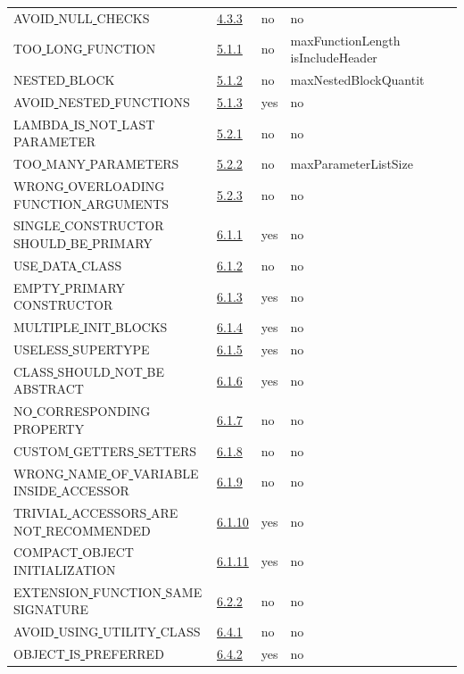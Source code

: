 \begin{longtable}{ |l|p{0.8cm}|p{0.8cm}| p{3cm} | }
AVOID\underline{ }NULL\underline{ }CHECKS & \hyperref[sec:4.3.3]{4.3.3} &  no  &   no  \\
TOO\underline{ }LONG\underline{ }FUNCTION & \hyperref[sec:5.1.1]{5.1.1} &  no  &   maxFunctionLength isIncludeHeader \\
NESTED\underline{ }BLOCK & \hyperref[sec:5.1.2]{5.1.2} &  no  &   maxNestedBlockQuantit\\
AVOID\underline{ }NESTED\underline{ }FUNCTIONS & \hyperref[sec:5.1.3]{5.1.3} &  yes  &   no  \\
LAMBDA\underline{ }IS\underline{ }NOT\underline{ }LAST\underline{ }PARAMETER & \hyperref[sec:5.2.1]{5.2.1} &  no  &   no \\
TOO\underline{ }MANY\underline{ }PARAMETERS & \hyperref[sec:5.2.2]{5.2.2} &  no  &   maxParameterListSize \\
WRONG\underline{ }OVERLOADING\underline{ }FUNCTION\underline{ }ARGUMENTS & \hyperref[sec:5.2.3]{5.2.3} &  no  &   no \\
SINGLE\underline{ }CONSTRUCTOR\underline{ }SHOULD\underline{ }BE\underline{ }PRIMARY & \hyperref[sec:6.1.1]{6.1.1} &  yes  &   no  \\
USE\underline{ }DATA\underline{ }CLASS & \hyperref[sec:6.1.2]{6.1.2} &  no  &   no  \\
EMPTY\underline{ }PRIMARY\underline{ }CONSTRUCTOR & \hyperref[sec:6.1.3]{6.1.3} &  yes  &   no  \\
MULTIPLE\underline{ }INIT\underline{ }BLOCKS & \hyperref[sec:6.1.4]{6.1.4} &  yes  &   no  \\
USELESS\underline{ }SUPERTYPE & \hyperref[sec:6.1.5]{6.1.5} &  yes  &   no  \\
CLASS\underline{ }SHOULD\underline{ }NOT\underline{ }BE\underline{ }ABSTRACT & \hyperref[sec:6.1.6]{6.1.6} &  yes  &   no  \\
NO\underline{ }CORRESPONDING\underline{ }PROPERTY & \hyperref[sec:6.1.7]{6.1.7} &  no  &   no  \\
CUSTOM\underline{ }GETTERS\underline{ }SETTERS & \hyperref[sec:6.1.8]{6.1.8} &  no  &   no  \\
WRONG\underline{ }NAME\underline{ }OF\underline{ }VARIABLE\underline{ }INSIDE\underline{ }ACCESSOR & \hyperref[sec:6.1.9]{6.1.9} &  no  &   no \\
TRIVIAL\underline{ }ACCESSORS\underline{ }ARE\underline{ }NOT\underline{ }RECOMMENDED & \hyperref[sec:6.1.10]{6.1.10} &  yes  &   no  \\
COMPACT\underline{ }OBJECT\underline{ }INITIALIZATION & \hyperref[sec:6.1.11]{6.1.11} &  yes  &   no  \\
EXTENSION\underline{ }FUNCTION\underline{ }SAME\underline{ }SIGNATURE & \hyperref[sec:6.2.2]{6.2.2} &  no  &   no  \\
AVOID\underline{ }USING\underline{ }UTILITY\underline{ }CLASS & \hyperref[sec:6.4.1]{6.4.1} &  no  &  no \\
OBJECT\underline{ }IS\underline{ }PREFERRED & \hyperref[sec:6.4.2]{6.4.2} &  yes  &  no \\
\hline
\end{longtable}

